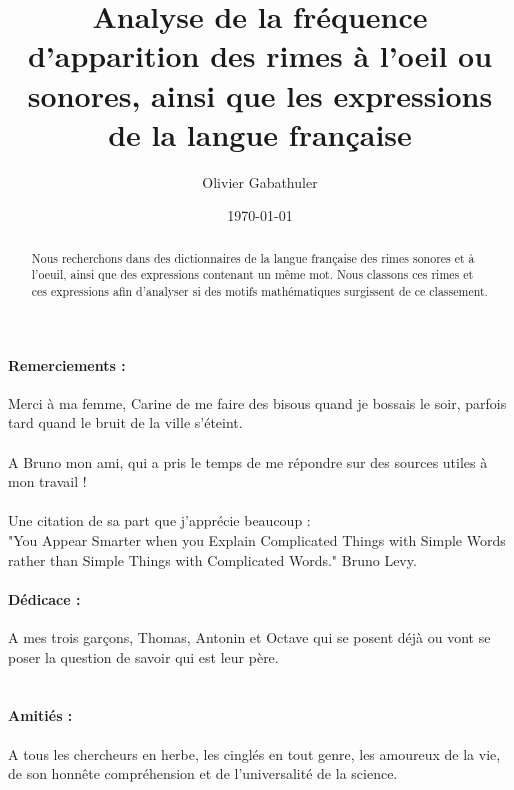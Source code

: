 \documentclass[french]{article}
\title{Analyse de la fréquence d'apparition des rimes à l'oeil ou sonores, ainsi que les expressions de la langue française}
\author{Olivier Gabathuler}
\date{\today}
\begin{document}
\maketitle
\begin{abstract}
Nous recherchons dans des dictionnaires de la langue française des rimes sonores et à l'oeuil, ainsi que des expressions contenant un même mot.
Nous classons ces rimes et ces expressions afin d'analyser si des motifs mathématiques surgissent de ce classement.
\end{abstract}
\tableofcontents
\newpage
\paragraph{Remerciements :\\}
Merci à ma femme, Carine de me faire des bisous quand je bossais le soir, parfois tard quand le bruit de la ville s'éteint.\\
\\A Bruno mon ami, qui a pris le temps de me répondre sur des sources utiles à mon travail !\\
\\Une citation de sa part que j'apprécie beaucoup :\\
"You Appear Smarter when you Explain Complicated Things with Simple Words rather than Simple Things with Complicated Words." Bruno Levy.\\
\paragraph{Dédicace :\\}
A mes trois garçons, Thomas, Antonin et Octave qui se posent déjà ou vont se poser la question de savoir qui est leur père.\\
\\
\paragraph{Amitiés :\\}
A tous les chercheurs en herbe, les cinglés en tout genre, les amoureux de la vie, de son honnête compréhension et de l'universalité de la science.\\
\end{document}
